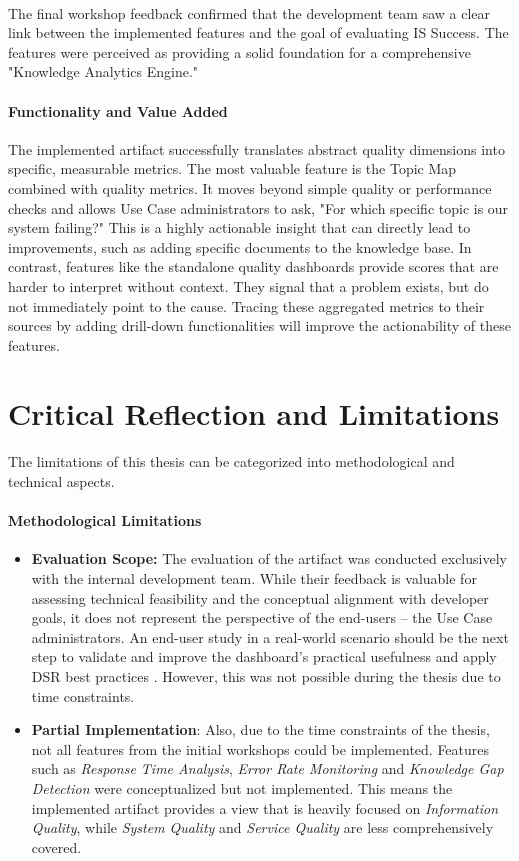 \documentclass[
	english,
	ruledheaders=section,%
	class=report,%
	thesis={type=bachelor},%
	accentcolor=1b,%
	custommargins=true,%
	marginpar=false,%
	parskip=half-,%
	fontsize=11pt,%
	DIV=14,
]{tudapub}
\begin{document}
\\
The final workshop feedback confirmed that the development team saw a clear link between the implemented features and the goal of evaluating IS Success. The features were perceived as providing a solid foundation for a comprehensive "Knowledge Analytics Engine."

\paragraph{Functionality and Value Added} The implemented artifact successfully translates abstract quality dimensions into specific, measurable metrics. The most valuable feature is the Topic Map combined with quality metrics. It moves beyond simple quality or performance checks and allows Use Case administrators to ask, "For which specific topic is our system failing?" This is a highly actionable insight that can directly lead to improvements, such as adding specific documents to the knowledge base. In contrast, features like the standalone quality dashboards provide scores that are harder to interpret without context. They signal that a problem exists, but do not immediately point to the cause. Tracing these aggregated metrics to their sources by adding drill-down functionalities will improve the actionability of these features.
\section{Critical Reflection and Limitations}
The limitations of this thesis can be categorized into methodological and technical aspects.

\paragraph{Methodological Limitations}
\begin{itemize}
    \item \textbf{Evaluation Scope:} The evaluation of the artifact was conducted exclusively with the internal development team. While their feedback is valuable for assessing technical feasibility and the conceptual alignment with developer goals, it does not represent the perspective of the end-users -- the Use Case administrators. An end-user study in a real-world scenario should be the next step to validate and improve the dashboard's practical usefulness and apply DSR best practices \parencite{Peffers2007}. However, this was not possible during the thesis due to time constraints.
    \item \textbf{Partial Implementation}: Also, due to the time constraints of the thesis, not all features from the initial workshops could be implemented. Features such as \textit{Response Time Analysis}, \textit{Error Rate Monitoring} and \textit{Knowledge Gap Detection} were conceptualized but not implemented. This means the implemented artifact provides a view that is heavily focused on \textit{Information Quality}, while \textit{System Quality} and \textit{Service Quality} are less comprehensively covered.
\end{itemize}
\end{document}
